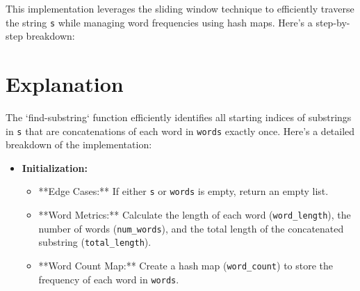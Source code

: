 This implementation leverages the sliding window technique to efficiently traverse the string \texttt{s} while managing word frequencies using hash maps. Here's a step-by-step breakdown:

\section*{Explanation}

The `find-substring` function efficiently identifies all starting indices of substrings in \texttt{s} that are concatenations of each word in \texttt{words} exactly once. Here's a detailed breakdown of the implementation:

\begin{itemize}
    \item \textbf{Initialization:}
    \begin{itemize}
        \item **Edge Cases:** If either \texttt{s} or \texttt{words} is empty, return an empty list.
        \item **Word Metrics:** Calculate the length of each word (\texttt{word\_length}), the number of words (\texttt{num\_words}), and the total length of the concatenated substring (\texttt{total\_length}).
        \item **Word Count Map:** Create a hash map (\texttt{word\_count}) to store the frequency of each word in \texttt{words}.
    \end{itemize}
    

\end{itemize}
